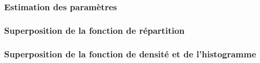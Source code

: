 \documentclass{article}
\begin{document}
\subsubsection{Estimation des paramètres}
\subsubsection{Superposition de la fonction de répartition}
\subsubsection{Superposition de la fonction de densité et de l'histogramme}

\newpage
\appendix

\section{}

\subsection{}

\subsubsection{}

\begin{verbatim}
\end{verbatim}
\end{document}
